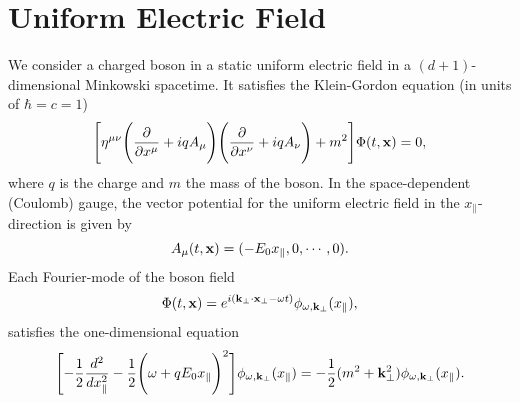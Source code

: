 \documentclass[a4paper,prd,showpacs,preprintnumbers,amsmath,amssymb]{revtex4}
\begin{document}
\section{Uniform Electric Field}



We consider a charged boson in a static uniform electric field in
a $(d+1)$-dimensional Minkowski spacetime. It satisfies the
Klein-Gordon equation (in units of $\hbar = c =1$)
\begin{equation}
\Biggl[\eta^{\mu \nu} \Biggl(\frac{\partial}{\partial x^{\mu}} + i
q A_{\mu} \Biggr) \Biggl(\frac{\partial}{\partial x^{\nu}} + i q
A_{\nu} \Biggr)  + m^2 \Biggr] \Phi (t, {\bf x}) = 0, \label{kg
eq}
\end{equation}
where $q$ is the charge and $m$ the mass of the boson. In the
space-dependent (Coulomb) gauge, the vector potential for the
uniform electric field in the $x_{\parallel}$-direction is given
by
\begin{equation}
A_{\mu} (t, {\bf x}) = ( - E_0 x_{\parallel}, 0, \cdots, 0).
\end{equation}
Each Fourier-mode of the boson field
\begin{equation}
\Phi (t, {\bf x}) = e^{i ( {\bf k}_{\perp} \cdot {\bf x}_{\perp} -
\omega t)} \phi_{\omega, {\bf k}_{\perp}} (x_{\parallel}),
\end{equation}
satisfies the one-dimensional equation
\begin{equation}
\Biggl[- \frac{1}{2} \frac{d^2}{dx_{\parallel}^2} -
\frac{1}{2}\Biggl( \omega + q E_0 x_{\parallel} \Biggr)^2 \Biggr]
\phi_{\omega, {\bf k}_{\perp}} (x_{\parallel}) = - \frac{1}{2}(m^2
+ {\bf k}_{\perp}^2) \phi_{\omega, {\bf k}_{\perp}}
(x_{\parallel}). \label{mod eq}
\end{equation}
\end{document}

